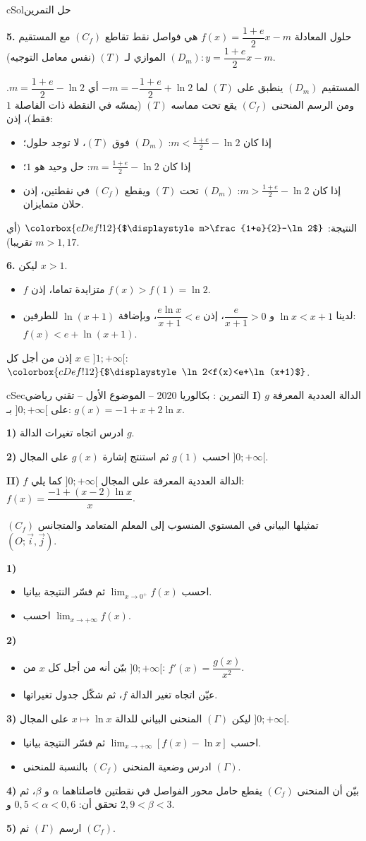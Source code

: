 \documentclass[12pt,a4paper]{article}
\newenvironment{BOX}[2]{\begin{otherlanguage}{english}\begin{arbox}{#1}{#2}}{\end{arbox}\end{otherlanguage}}
\newcounter{exo}
\newenvironment{tamrin}[1]{\stepcounter{exo}\begin{BOX}{cSec}{التمرين \theexo: #1}}{\end{BOX}}
\newenvironment{hal}{\Needspace{12\baselineskip}\begin{otherlanguage}{english}\begin{arbox}[breakable]{cSol}{حل التمرين \theexo}}{\end{arbox}\end{otherlanguage}}
\newcommand{\bx}[1]{\ensuremath{\colorbox{cDef!12}{$\displaystyle #1$}}}
\newenvironment{sq}{\begin{itemize}[leftmargin=2.4em,itemsep=3pt]}{\end{itemize}}
\newcommand{\qa}{\item[(أ)]}\newcommand{\qb}{\item[(ب)]}\newcommand{\qc}{\item[(جـ)]}\newcommand{\qd}{\item[(د)]}\newcommand{\qe}{\item[(هـ)]}
\newcommand{\QQ}[1]{\par\smallskip\textbf{#1.} }
\begin{document}
\begin{hal}
\QQ{5} حلول المعادلة $f(x)=\dfrac{1+e}{2}x-m$ هي فواصل نقط تقاطع $(C_f)$ مع المستقيم $(D_m):y=\dfrac{1+e}{2}x-m$ الموازي لـ $(T)$ (نفس معامل التوجيه).

المستقيم $(D_m)$ ينطبق على $(T)$ لما $-m=-\dfrac{1+e}{2}+\ln2$ أي $m=\dfrac{1+e}{2}-\ln2$. ومن الرسم المنحنى $(C_f)$ يقع تحت مماسه $(T)$ (يمسّه في النقطة ذات الفاصلة $1$ فقط)، إذن:
\begin{itemize}
\item إذا كان $m<\frac{1+e}{2}-\ln2$: $(D_m)$ فوق $(T)$، لا توجد حلول؛
\item إذا كان $m=\frac{1+e}{2}-\ln2$: حل وحيد هو $1$؛
\item إذا كان $m>\frac{1+e}{2}-\ln2$: $(D_m)$ تحت $(T)$ ويقطع $(C_f)$ في نقطتين، إذن حلان متمايزان.
\end{itemize}
النتيجة: \bx{m>\frac{1+e}{2}-\ln2} (أي $m>1{,}17$ تقريبا).

\QQ{6} ليكن $x>1$.
\begin{itemize}
\item $f$ متزايدة تماما، إذن $f(x)>f(1)=\ln2$.
\item لدينا $\ln x<x+1$ و $\dfrac{e}{x+1}>0$، إذن $\dfrac{e\ln x}{x+1}<e$، وبإضافة $\ln(x+1)$ للطرفين: $f(x)<e+\ln(x+1)$.
\end{itemize}
إذن من أجل كل $x\in]1;+\infty[$: \bx{\ln2<f(x)<e+\ln(x+1)}.
\end{hal}

\begin{tamrin}{بكالوريا 2020 -- الموضوع الأول -- تقني رياضي}
\textbf{I)} $g$ الدالة العددية المعرفة على $]0;+\infty[$ بـ: $g(x)=-1+x+2\ln x$.

\textbf{1)} ادرس اتجاه تغيرات الدالة $g$.

\textbf{2)} احسب $g(1)$ ثم استنتج إشارة $g(x)$ على المجال $]0;+\infty[$.

\textbf{II)} $f$ الدالة العددية المعرفة على المجال $]0;+\infty[$ كما يلي: $f(x)=\dfrac{-1+(x-2)\ln x}{x}$.

$(C_f)$ تمثيلها البياني في المستوي المنسوب إلى المعلم المتعامد والمتجانس $(O;\vec i,\vec j)$.

\textbf{1)}
\begin{sq}
\qa احسب $\displaystyle\lim_{x\to0^+}f(x)$ ثم فسّر النتيجة بيانيا.
\qb احسب $\displaystyle\lim_{x\to+\infty}f(x)$.
\end{sq}
\textbf{2)}
\begin{sq}
\qa بيّن أنه من أجل كل $x$ من $]0;+\infty[$: $f'(x)=\dfrac{g(x)}{x^2}$.
\qb عيّن اتجاه تغير الدالة $f$، ثم شكّل جدول تغيراتها.
\end{sq}
\textbf{3)} ليكن $(\Gamma)$ المنحنى البياني للدالة $x\mapsto\ln x$ على المجال $]0;+\infty[$.
\begin{sq}
\qa احسب $\displaystyle\lim_{x\to+\infty}\left[f(x)-\ln x\right]$ ثم فسّر النتيجة بيانيا.
\qb ادرس وضعية المنحنى $(C_f)$ بالنسبة للمنحنى $(\Gamma)$.
\end{sq}
\textbf{4)} بيّن أن المنحنى $(C_f)$ يقطع حامل محور الفواصل في نقطتين فاصلتاهما $\alpha$ و $\beta$، ثم تحقق أن: $0{,}5<\alpha<0{,}6$ و $2{,}9<\beta<3$.

\textbf{5)} ارسم $(\Gamma)$ ثم $(C_f)$.
\end{tamrin}
\end{document}
